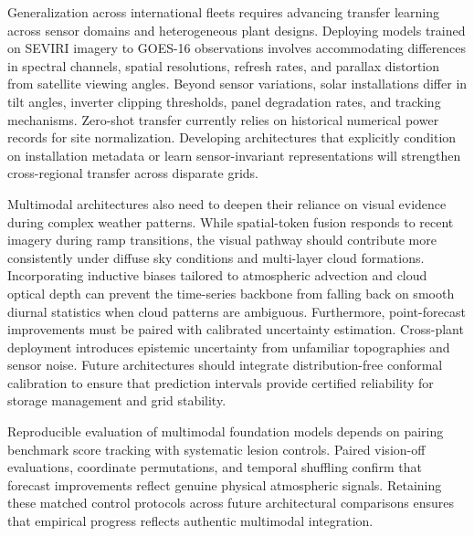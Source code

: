 Generalization across international fleets requires advancing transfer learning across sensor domains and heterogeneous plant designs. Deploying models trained on SEVIRI imagery to GOES-16 observations involves accommodating differences in spectral channels, spatial resolutions, refresh rates, and parallax distortion from satellite viewing angles. Beyond sensor variations, solar installations differ in tilt angles, inverter clipping thresholds, panel degradation rates, and tracking mechanisms. Zero-shot transfer currently relies on historical numerical power records for site normalization. Developing architectures that explicitly condition on installation metadata or learn sensor-invariant representations will strengthen cross-regional transfer across disparate grids.

Multimodal architectures also need to deepen their reliance on visual evidence during complex weather patterns. While spatial-token fusion responds to recent imagery during ramp transitions, the visual pathway should contribute more consistently under diffuse sky conditions and multi-layer cloud formations. Incorporating inductive biases tailored to atmospheric advection and cloud optical depth can prevent the time-series backbone from falling back on smooth diurnal statistics when cloud patterns are ambiguous. Furthermore, point-forecast improvements must be paired with calibrated uncertainty estimation. Cross-plant deployment introduces epistemic uncertainty from unfamiliar topographies and sensor noise. Future architectures should integrate distribution-free conformal calibration to ensure that prediction intervals provide certified reliability for storage management and grid stability.

Reproducible evaluation of multimodal foundation models depends on pairing benchmark score tracking with systematic lesion controls. Paired vision-off evaluations, coordinate permutations, and temporal shuffling confirm that forecast improvements reflect genuine physical atmospheric signals. Retaining these matched control protocols across future architectural comparisons ensures that empirical progress reflects authentic multimodal integration.
